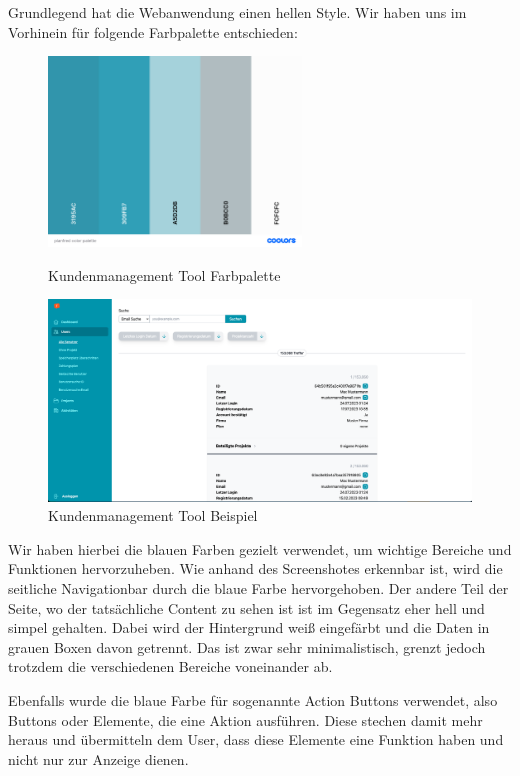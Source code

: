 Grundlegend hat die Webanwendung einen hellen Style. Wir haben uns im Vorhinein für folgende Farbpalette entschieden:

\begin{figure}[h!]
    \centering
    \includegraphics[width=0.6\textwidth]{pics/planfred-color-palette.png}
    \caption{Kundenmanagement Tool Farbpalette}
    \cite{frontend_design_colors}
    \label{fig:mesh1}
\end{figure}

\begin{figure}[h!]
    \centering
    \includegraphics[width=1\textwidth]{pics/planfred-ui-ux-example.png}
    \caption{Kundenmanagement Tool Beispiel}
    \label{fig:mesh1}
\end{figure}

Wir haben hierbei die blauen Farben gezielt verwendet, um wichtige Bereiche und Funktionen hervorzuheben. Wie anhand des Screenshotes erkennbar ist, wird die seitliche Navigationbar durch die blaue Farbe hervorgehoben. Der andere Teil der Seite, wo der tatsächliche Content zu sehen ist ist im Gegensatz eher hell und simpel gehalten. Dabei wird der Hintergrund weiß eingefärbt und die Daten in grauen Boxen davon getrennt. Das ist zwar sehr minimalistisch, grenzt jedoch trotzdem die verschiedenen Bereiche voneinander ab.

Ebenfalls wurde die blaue Farbe für sogenannte Action Buttons verwendet, also Buttons oder Elemente, die eine Aktion ausführen. Diese stechen damit mehr heraus und übermitteln dem User, dass diese Elemente eine Funktion haben und nicht nur zur Anzeige dienen.

